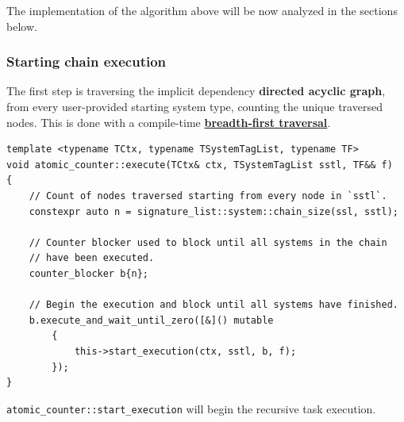 \documentclass[oneside, 12pt, a4paper, openany]{book}
\begin{document}
\begin{algorithm}[H]
{        
        \F{\SystemOf{\T}}\;
        \DecrementAtomicCounter{\RemainingSystems}\;
        \BlankLine


    }
    \KwEnd

\end{algorithm}

The implementation of the algorithm above will be now analyzed in the
sections below.

\hypertarget{mt_s_sce}{\subsubsection{Starting chain
execution}\label{mt_s_sce}}

The first step is traversing the implicit dependency \textbf{directed
acyclic graph}, from every user-provided starting system type, counting
the unique traversed nodes. This is done with a compile-time
\protect\hyperlink{appendix_compiletime_bfs}{\textbf{breadth-first
traversal}}.

\begin{verbatim}
template <typename TCtx, typename TSystemTagList, typename TF>
void atomic_counter::execute(TCtx& ctx, TSystemTagList sstl, TF&& f)
{
    // Count of nodes traversed starting from every node in `sstl`.
    constexpr auto n = signature_list::system::chain_size(ssl, sstl);

    // Counter blocker used to block until all systems in the chain
    // have been executed.
    counter_blocker b{n};

    // Begin the execution and block until all systems have finished.
    b.execute_and_wait_until_zero([&]() mutable
        {
            this->start_execution(ctx, sstl, b, f);
        });
}
\end{verbatim}

\texttt{atomic_counter::start_execution}
will begin the recursive task execution.
\end{document}
